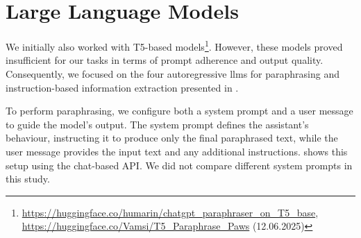 \chapter{Large Language Models}
\label{app:language_models}

We initially also worked with T5-based models\footnote{\url{https://huggingface.co/humarin/chatgpt_paraphraser_on_T5_base}, \url{https://huggingface.co/Vamsi/T5_Paraphrase_Paws} (12.06.2025)}. However, these models proved insufficient for our tasks in terms of prompt adherence and output quality. 
Consequently, we focused on the four autoregressive \acp{llm} for paraphrasing and instruction-based information extraction presented in .

\begin{table}[h]
\centering
\caption{Collection of multilingual \acp{llm} used for paraphrasing\protect\footnotemark.}
\label{tab:llm_paraphrasers}
\end{table}

To perform paraphrasing, we configure both a system prompt and a user message to guide the model's output. 
The system prompt defines the assistant’s behaviour, instructing it to produce only the final paraphrased text, while the user message provides the input text and any additional instructions. 
 shows this setup using the chat-based API.
We did not compare different system prompts in this study.


